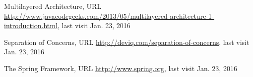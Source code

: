 \begin{thebibliography}{99}
 Multilayered Architecture, URL
\url{http://www.javacodegeeks.com/2013/05/multilayered-architecture-1-introduction.html}, last visit Jan. 23, 2016

 Separation of Concerns, URL
\url{http://deviq.com/separation-of-concerns}, last visit Jan. 23, 2016

 The Spring Framework, URL
\url{http://www.spring.org}, last visit Jan. 23, 2016




\end{thebibliography}
